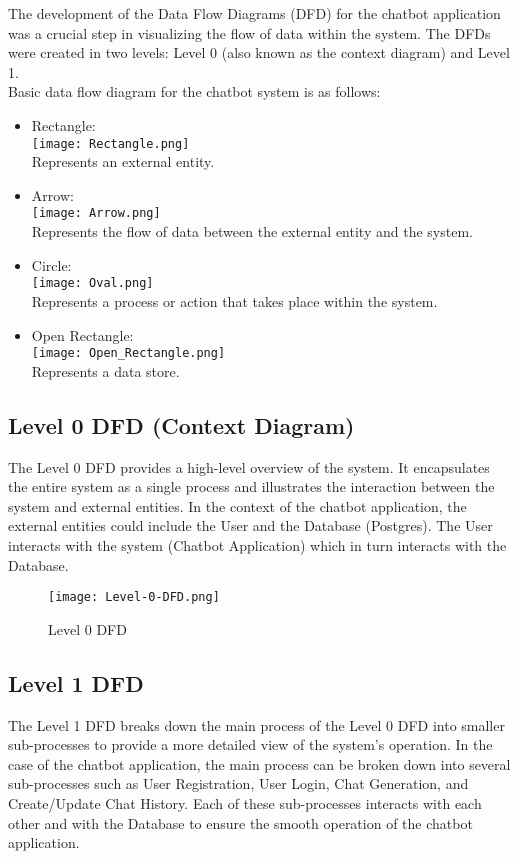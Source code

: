 The development of the Data Flow Diagrams (DFD) for the chatbot application was a crucial step in visualizing the flow of data within the system. The DFDs were created in two levels: Level 0 (also known as the context diagram) and Level 1.\\
Basic data flow diagram for the chatbot system is as follows:
\begin{itemize}
  \item Rectangle: \\
    \texttt{[image: Rectangle.png]}\\ Represents an external entity.
  \item Arrow: \\
    \texttt{[image: Arrow.png]}\\ Represents the flow of data between the external entity and the system.
  \item Circle: \\
   \texttt{[image: Oval.png]}\\ Represents a process or action that takes place within the system.
   \item Open Rectangle: \\
    \texttt{[image: Open\_Rectangle.png]}\\ Represents a data store.
\end{itemize}

\subsection{Level 0 DFD (Context Diagram) }
 
The Level 0 DFD provides a high-level overview of the system. It encapsulates the entire system as a single process and illustrates the interaction between the system and external entities. In the context of the chatbot application, the external entities could include the User and the Database (Postgres). The User interacts with the system (Chatbot Application) which in turn interacts with the Database.

\begin{figure}[h]
  \centering
  \texttt{[image: Level-0-DFD.png]}
  \caption{Level 0 DFD}\label{fig:level-0-dfd}
\end{figure}

\subsection{Level 1 DFD}
The Level 1 DFD breaks down the main process of the Level 0 DFD into smaller sub-processes to provide a more detailed view of the system's operation. In the case of the chatbot application, the main process can be broken down into several sub-processes such as User Registration, User Login, Chat Generation, and Create/Update Chat History. Each of these sub-processes interacts with each other and with the Database to ensure the smooth operation of the chatbot application.

